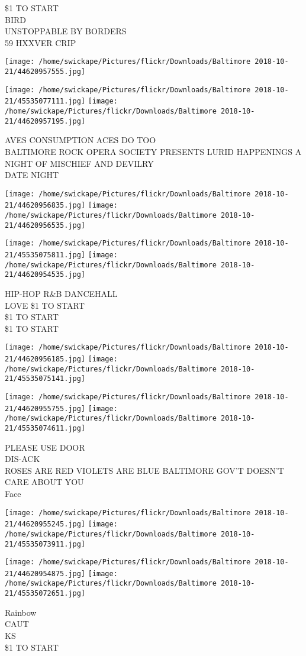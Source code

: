\documentclass[10pt,letterpaper]{article}
\begin{document}
\$1 TO START\\
BIRD\\
UNSTOPPABLE BY BORDERS\\
59 HXXVER CRIP
\pagebreak

\texttt{[image: /home/swickape/Pictures/flickr/Downloads/Baltimore 2018-10-21/44620957555.jpg]}

\vspace{0.25in}
\texttt{[image: /home/swickape/Pictures/flickr/Downloads/Baltimore 2018-10-21/45535077111.jpg]}
\texttt{[image: /home/swickape/Pictures/flickr/Downloads/Baltimore 2018-10-21/44620957195.jpg]}

AVES CONSUMPTION ACES DO TOO\\
BALTIMORE ROCK OPERA SOCIETY PRESENTS LURID HAPPENINGS A NIGHT OF MISCHIEF AND DEVILRY\\
DATE NIGHT
\pagebreak

\texttt{[image: /home/swickape/Pictures/flickr/Downloads/Baltimore 2018-10-21/44620956835.jpg]}
\texttt{[image: /home/swickape/Pictures/flickr/Downloads/Baltimore 2018-10-21/44620956535.jpg]}

\texttt{[image: /home/swickape/Pictures/flickr/Downloads/Baltimore 2018-10-21/45535075811.jpg]}
\texttt{[image: /home/swickape/Pictures/flickr/Downloads/Baltimore 2018-10-21/44620954535.jpg]}

HIP{-}HOP R\&B DANCEHALL\\
LOVE \$1 TO START\\
\$1 TO START\\
\$1 TO START
\pagebreak

\texttt{[image: /home/swickape/Pictures/flickr/Downloads/Baltimore 2018-10-21/44620956185.jpg]}
\texttt{[image: /home/swickape/Pictures/flickr/Downloads/Baltimore 2018-10-21/45535075141.jpg]}

\texttt{[image: /home/swickape/Pictures/flickr/Downloads/Baltimore 2018-10-21/44620955755.jpg]}
\texttt{[image: /home/swickape/Pictures/flickr/Downloads/Baltimore 2018-10-21/45535074611.jpg]}

PLEASE USE DOOR\\
DIS{-}ACK\\
ROSES ARE RED VIOLETS ARE BLUE BALTIMORE GOV'T DOESN'T CARE ABOUT YOU\\
Face
\pagebreak

\texttt{[image: /home/swickape/Pictures/flickr/Downloads/Baltimore 2018-10-21/44620955245.jpg]}
\texttt{[image: /home/swickape/Pictures/flickr/Downloads/Baltimore 2018-10-21/45535073911.jpg]}

\texttt{[image: /home/swickape/Pictures/flickr/Downloads/Baltimore 2018-10-21/44620954875.jpg]}
\texttt{[image: /home/swickape/Pictures/flickr/Downloads/Baltimore 2018-10-21/45535072651.jpg]}

Rainbow\\
CAUT\\
KS\\
\$1 TO START
\pagebreak
\end{document}
